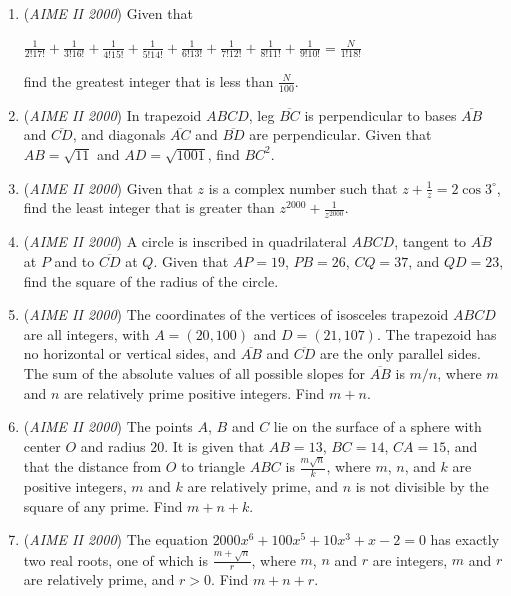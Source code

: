 \begin{enumerate}
 

	\item (\textit{AIME II 2000}) 
Given that 

 $\frac 1{2!17!}+\frac 1{3!16!}+\frac 1{4!15!}+\frac 1{5!14!}+\frac 1{6!13!}+\frac 1{7!12!}+\frac 1{8!11!}+\frac 1{9!10!}=\frac N{1!18!}$

  find the greatest integer that is less than $\frac N{100}$.


 

	\item (\textit{AIME II 2000}) In trapezoid $ABCD$, leg $\overline{BC}$ is perpendicular to bases $\overline{AB}$ and $\overline{CD}$, and diagonals $\overline{AC}$ and $\overline{BD}$ are perpendicular. Given that $AB=\sqrt{11}$ and $AD=\sqrt{1001}$, find $BC^2$.


 

	\item (\textit{AIME II 2000}) Given that $z$ is a complex number such that $z+\frac 1z=2\cos 3^\circ$, find the least integer that is greater than $z^{2000}+\frac 1{z^{2000}}$.


 

	\item (\textit{AIME II 2000}) A circle is inscribed in quadrilateral $ABCD$, tangent to $\overline{AB}$ at $P$ and to $\overline{CD}$ at $Q$. Given that $AP=19$, $PB=26$, $CQ=37$, and $QD=23$, find the square of the radius of the circle.


 

	\item (\textit{AIME II 2000}) The coordinates of the vertices of isosceles trapezoid $ABCD$ are all integers, with $A=(20,100)$ and $D=(21,107)$. The trapezoid has no horizontal or vertical sides, and $\overline{AB}$ and $\overline{CD}$ are the only parallel sides. The sum of the absolute values of all possible slopes for $\overline{AB}$ is $m/n$, where $m$ and $n$ are relatively prime positive integers. Find $m+n$.


 

	\item (\textit{AIME II 2000}) The points $A$, $B$ and $C$ lie on the surface of a sphere with center $O$ and radius $20$. It is given that $AB=13$, $BC=14$, $CA=15$, and that the distance from $O$ to triangle $ABC$ is $\frac{m\sqrt{n}}k$, where $m$, $n$, and $k$ are positive integers, $m$ and $k$ are relatively prime, and $n$ is not divisible by the square of any prime. Find $m+n+k$.


 

	\item (\textit{AIME II 2000}) The equation $2000x^6+100x^5+10x^3+x-2=0$ has exactly two real roots, one of which is $\frac{m+\sqrt{n}}r$, where $m$, $n$ and $r$ are integers, $m$ and $r$ are relatively prime, and $r>0$. Find $m+n+r$.



\end{enumerate}
